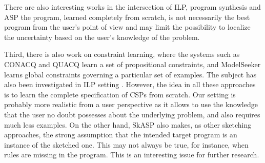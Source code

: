 There are also interesting works in the intersection of ILP, program synthesis and ASP  the program, learned completely from scratch, is not necessarily the best program from the user's point of view and may limit the possibility to localize the uncertainty based on the user's knowledge of the problem.  

Third, there is also work on constraint learning, where the systems such as CONACQ \parencite{original_constraint_learning,besetalAIJ17} and QUACQ \parencite{QUACQ} learn a set of propositional constraints,  and ModelSeeker \parencite{BeldiceanuS12} learns global constraints governing a particular set of examples.  The subject has also been investigated in ILP setting \parencite{lallouet}. 
However, the idea in all these approaches is to learn the complete specification of CSPs from scratch. Our setting is probably more realistic 
from a user perspective as it allows to use the knowledge that the user no doubt possesses about the underlying problem,
and also requires much less examples.  On the other hand, SkASP also makes, as other sketching approaches,
the strong assumption that the intended target program is an instance of the sketched one. This may not always
be true, for instance, when rules are missing in the program.  This is an interesting issue for further research.

